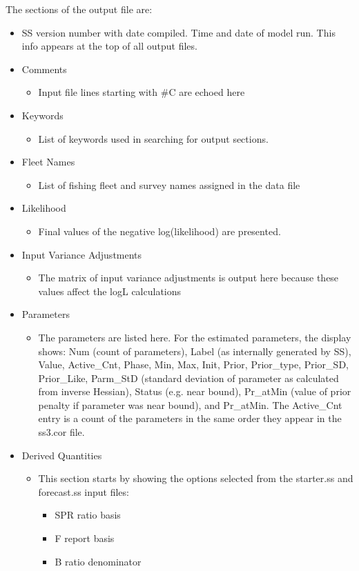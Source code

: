 The sections of the output file are:
\begin{itemize}
	\item SS version number with date compiled.  Time and date of model run.  This info appears at the top of all output files.
	\item Comments
		\begin{itemize}
			\item 	Input file lines starting with \#C are echoed here
		\end{itemize}
	\item Keywords
		\begin{itemize}
			\item List of keywords used in searching for output sections.
		\end{itemize}
	\item Fleet Names
		\begin{itemize}
			\item List of fishing fleet and survey names assigned in the data file
		\end{itemize}
	\item Likelihood
		\begin{itemize}
			\item Final values of the negative log(likelihood) are presented.
		\end{itemize}
	\item Input Variance Adjustments
		\begin{itemize}
			\item The matrix of input variance adjustments is output here because these values affect the logL calculations
		\end{itemize}
	\item Parameters
		\begin{itemize}
			\item The parameters are listed here.  For the estimated parameters, the display shows: Num (count of parameters), Label (as internally generated by SS), Value, Active\_Cnt, Phase, Min, Max, Init, Prior, Prior\_type, Prior\_SD, Prior\_Like, Parm\_StD (standard deviation of parameter as calculated from inverse Hessian), Status (e.g. near bound), Pr\_atMin (value of prior penalty if parameter was near bound), and  Pr\_atMin.  The Active\_Cnt entry is a count of the parameters in the same order they appear in the ss3.cor file.
		\end{itemize}
	\item Derived Quantities
		\begin{itemize}
			\item This section starts by showing the options selected from the starter.ss and forecast.ss input files:
				\begin{itemize}
					\item SPR ratio basis
					\item F report basis
					\item B ratio denominator
				\end{itemize}
		\end{itemize}
\end{itemize}

